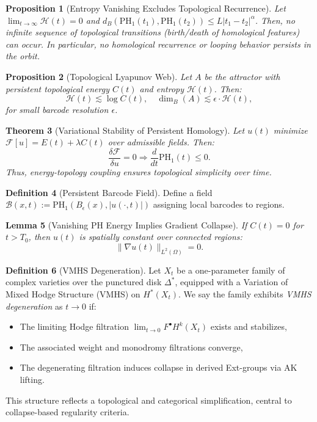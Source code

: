\documentclass[11pt]{article}
\newtheorem{theorem}{Theorem}[section]
\newtheorem{lemma}[theorem]{Lemma}
\newtheorem{proposition}[theorem]{Proposition}
\theoremstyle{definition}
\newtheorem{definition}[theorem]{Definition}
\begin{document}
\begin{proposition}[Entropy Vanishing Excludes Topological Recurrence]
Let $\lim_{t \to \infty} \mathcal{H}(t) = 0$ and $d_B(\mathrm{PH}_1(t_1), \mathrm{PH}_1(t_2)) \le L |t_1 - t_2|^\alpha$. Then, no infinite sequence of topological transitions (birth/death of homological features) can occur. In particular, no homological recurrence or looping behavior persists in the orbit.
\end{proposition}

\begin{proposition}[Topological Lyapunov Web]
Let $A$ be the attractor with persistent topological energy $C(t)$ and entropy $\mathcal{H}(t)$. Then:
\[
\mathcal{H}(t) \lesssim \log C(t), \quad \dim_B(A) \lesssim \epsilon \cdot \mathcal{H}(t),
\]
for small barcode resolution $\epsilon$.
\end{proposition}

\begin{theorem}[Variational Stability of Persistent Homology]
Let $u(t)$ minimize $\mathcal{F}[u] = E(t) + \lambda C(t)$ over admissible fields. Then:
\[
\frac{\delta \mathcal{F}}{\delta u} = 0 \Rightarrow \frac{d}{dt} \mathrm{PH}_1(t) \le 0.
\]
Thus, energy-topology coupling ensures topological simplicity over time.
\end{theorem}

\begin{definition}[Persistent Barcode Field]
Define a field $\mathcal{B}(x,t) := \mathrm{PH}_1(B_\epsilon(x), |u(\cdot,t)|)$ assigning local barcodes to regions.
\end{definition}

\begin{lemma}[Vanishing PH Energy Implies Gradient Collapse]
If $C(t) = 0$ for $t > T_0$, then $u(t)$ is spatially constant over connected regions:
\[
\|\nabla u(t)\|_{L^2(\Omega)} = 0.
\]
\end{lemma}

\begin{definition}[VMHS Degeneration] \label{def:vmhs-collapse}
Let $X_t$ be a one-parameter family of complex varieties over the punctured disk $\Delta^*$, equipped with a Variation of Mixed Hodge Structure (VMHS) on $H^*(X_t)$.  
We say the family exhibits \emph{VMHS degeneration} as $t \to 0$ if:
\begin{itemize}
  \item The limiting Hodge filtration $\lim_{t \to 0} F^\bullet H^k(X_t)$ exists and stabilizes,
  \item The associated weight and monodromy filtrations converge,
  \item The degenerating filtration induces collapse in derived Ext-groups via AK lifting.
\end{itemize}
This structure reflects a topological and categorical simplification, central to collapse-based regularity criteria.
\end{definition}
\end{document}
